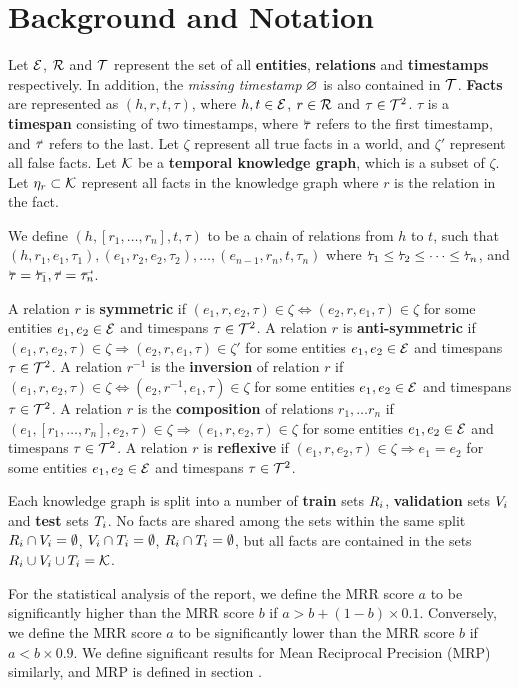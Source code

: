 \section{Background and Notation}
\label{sec:background-and-notation}

Let $\mathcal{E}$, $\mathcal{R}$ and $\mathcal{T}$ represent the set of all \textbf{entities}, \textbf{relations} and \textbf{timestamps} respectively. In addition, the \textit{missing timestamp} $\varnothing$ is also contained in $\mathcal{T}$. \textbf{Facts} are represented as $(h, r, t, \tau)$, where $h, t \in \mathcal{E}$, $r \in \mathcal{R}$ and $\tau \in \mathcal{T}^2$. $\tau$ is a \textbf{timespan} consisting of two timestamps, where $\timebegin{\tau}$ refers to the first timestamp, and $\timeend{\tau}$ refers to the last. Let $\zeta$ represent all true facts in a world, and $\zeta'$ represent all false facts. Let $\mathcal{K}$ be a \textbf{temporal knowledge graph}, which is a subset of $\zeta$. Let $\eta_r \subset \mathcal{K}$ represent all facts in the knowledge graph where $r$ is the relation in the fact.

We define $(h, [r_1, \dots, r_n], t, \tau)$ to be a chain of relations from $h$ to $t$, such that $(h, r_1, e_1, \tau_1), (e_1, r_2, e_2, \tau_2), \dots, (e_{n-1}, r_n, t, \tau_n)$ where $\timebegin{\tau_1} \leq \timebegin{\tau_2} \leq \dots \leq \timebegin{\tau_n}$, and $\timebegin{\tau} = \timebegin{\tau_1}, \timeend{\tau} = \timeend{\tau_n}$.

A relation $r$ is \textbf{symmetric} if $(e_1, r, e_2, \tau) \in \zeta \Leftrightarrow (e_2, r, e_1, \tau) \in \zeta$ for some entities $e_1, e_2 \in \mathcal{E}$ and timespans $\tau \in \mathcal{T}^2$.
A relation $r$ is \textbf{anti-symmetric} if $(e_1, r, e_2, \tau) \in \zeta \Rightarrow (e_2, r, e_1, \tau) \in \zeta'$ for some entities $e_1, e_2 \in \mathcal{E}$ and timespans $\tau \in \mathcal{T}^2$.
A relation $r^{-1}$ is the \textbf{inversion} of relation $r$ if $(e_1, r, e_2, \tau) \in \zeta \Leftrightarrow (e_2, r^{-1}, e_1, \tau) \in \zeta$ for some entities $e_1, e_2 \in \mathcal{E}$ and timespans $\tau \in \mathcal{T}^2$.
A relation $r$ is the \textbf{composition} of relations $r_1, \dots r_n$ if $(e_1, [r_1, \dots, r_n], e_2, \tau) \in \zeta \Rightarrow (e_1, r, e_2, \tau) \in \zeta$ for some entities $e_1, e_2 \in \mathcal{E}$ and timespans $\tau \in \mathcal{T}^2$.
A relation $r$ is \textbf{reflexive} if $(e_1, r, e_2, \tau) \in \zeta \Rightarrow e_1 = e_2$ for some entities $e_1, e_2 \in \mathcal{E}$ and timespans $\tau \in \mathcal{T}^2$.

Each knowledge graph is split into a number of \textbf{train} sets $R_i$, \textbf{validation} sets $V_i$ and \textbf{test} sets $T_i$. No facts are shared among the sets within the same split $R_i \cap V_i = \emptyset$, $V_i \cap T_i = \emptyset$, $R_i \cap T_i = \emptyset$, but all facts are contained in the sets $R_i \cup V_i \cup T_i = \mathcal{K}$.

For the statistical analysis of the report, we define the MRR score $a$ to be significantly higher than the MRR score $b$ if $a > b + (1-b) \times 0.1$. Conversely, we define the MRR score $a$ to be significantly lower than the MRR score $b$ if $a < b \times 0.9$. We define significant results for Mean Reciprocal Precision (MRP) similarly, and MRP is defined in section \missing[X].

